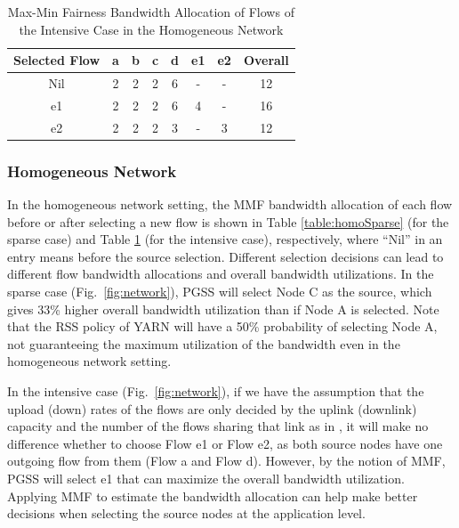 \documentclass[10pt,journal,compsoc]{IEEEtran}
\begin{document}
\begin{table}[!t]
\renewcommand{\arraystretch}{1}
\caption{Max-Min Fairness Bandwidth Allocation of Flows of the Intensive Case in the Homogeneous Network}
\label{table:homoIntensive}
\centering
\begin{tabularx}{.42\textwidth}{c||c|c|c|c|c|c|c}
\hline
\textbf{Selected Flow} & \textbf{a} & \textbf{b} & \textbf{c} & \textbf{d} & \textbf{e1} &\textbf{e2} &\textbf{Overall}\\
\hline
Nil &2&2&2&6&-&-&12\\
\hline
e1 &2&2&2&6&4&-&16\\
\hline
e2 &2&2&2&3&-&3&12\\
\hline
\end{tabularx}
\end{table}


\subsubsection{Homogeneous Network}
In the homogeneous network setting, the MMF bandwidth
allocation of each flow before or after selecting a new flow is
shown in Table \ref{table:homoSparse} (for the sparse case) and Table
\ref{table:homoIntensive} (for the intensive case), respectively, where ``Nil'' in an entry means before the source selection.
Different selection decisions can lead to different flow bandwidth allocations and overall bandwidth utilizations. 
In the sparse case (Fig.~\ref{fig:network}), PGSS will select Node C as the source, which gives 33\% higher overall
bandwidth utilization than if Node A is selected.
Note that the RSS policy of YARN will have a 50\% probability of selecting
Node A, not guaranteeing the maximum utilization of the bandwidth
even in the homogeneous network setting.

In the intensive case (Fig.~\ref{fig:network}), if we have the assumption that the upload (down)
rates of the flows are only decided by the uplink (downlink)
capacity and the number of the flows sharing that link
as in \cite{chowdhury2011managing},
it will make no difference whether to choose Flow e1 or Flow e2,
as both source nodes have one outgoing flow from them 
(Flow a and Flow d). 
However, by the notion of MMF, PGSS will select e1 that can maximize the overall bandwidth utilization. 
Applying MMF to estimate the bandwidth allocation can
help make better decisions when selecting the source nodes at the
application level.
\end{document}
